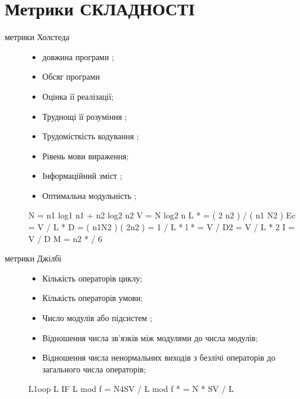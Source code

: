 \section{Метрики СКЛАДНОСТІ}
\label{2section:id7}\begin{description}
\item[{метрики Холстеда}] \leavevmode\begin{itemize}
\item {} 
довжина програми ;

\item {} 
Обсяг програми

\item {} 
Оцінка її реалізації;

\item {} 
Труднощі її розуміння ;

\item {} 
Трудомісткість кодування ;

\item {} 
Рівень мови вираження;

\item {} 
Інформаційний зміст ;

\item {} 
Оптимальна модульність ;

\end{itemize}

N = n1 log1 n1 + n2 log2 n2
V = N log2 n
L * = ( 2 n2 ) / ( n1 N2 )
Ec = V / L *
D = ( n1N2 ) ( 2n2 ) = 1 / L *
l * = V / D2 = V / L * 2
I = V / D
M = n2 * / 6

\item[{метрики Джілбі}] \leavevmode\begin{itemize}
\item {} 
Кількість операторів циклу;

\item {} 
Кількість операторів умови;

\item {} 
Число модулів або підсистем ;

\item {} 
Відношення числа зв'язків між модулями до числа модулів;

\item {} 
Відношення числа ненормальних виходів з безлічі операторів до загального числа операторів;

\end{itemize}

L1oop
L IF
L mod
f = N4SV / L mod
f * = N * SV / L


\end{description}
